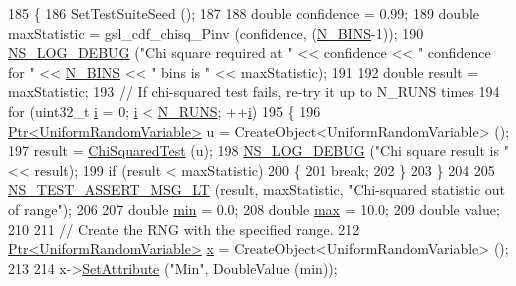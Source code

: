 \begin{DoxyCode}
185 \{
186   SetTestSuiteSeed ();
187 
188   \textcolor{keywordtype}{double} confidence = 0.99;
189   \textcolor{keywordtype}{double} maxStatistic = gsl\_cdf\_chisq\_Pinv (confidence, (\hyperlink{classRandomVariableStreamUniformTestCase_ab9bd5ab207c7358f8425b7b4ca516c42}{N\_BINS}-1));
190   \hyperlink{group__logging_ga413f1886406d49f59a6a0a89b77b4d0a}{NS\_LOG\_DEBUG} (\textcolor{stringliteral}{"Chi square required at "} << confidence << \textcolor{stringliteral}{" confidence for "} << 
      \hyperlink{classRandomVariableStreamUniformTestCase_ab9bd5ab207c7358f8425b7b4ca516c42}{N\_BINS} << \textcolor{stringliteral}{" bins is "} << maxStatistic);
191 
192   \textcolor{keywordtype}{double} result = maxStatistic;
193   \textcolor{comment}{// If chi-squared test fails, re-try it up to N\_RUNS times}
194   \textcolor{keywordflow}{for} (uint32\_t \hyperlink{bernuolliDistribution_8m_a6f6ccfcf58b31cb6412107d9d5281426}{i} = 0; \hyperlink{bernuolliDistribution_8m_a6f6ccfcf58b31cb6412107d9d5281426}{i} < \hyperlink{classRandomVariableStreamUniformTestCase_a12d6e3ab344655b6af2b31b5dcc043af}{N\_RUNS}; ++\hyperlink{bernuolliDistribution_8m_a6f6ccfcf58b31cb6412107d9d5281426}{i})
195     \{
196       \hyperlink{classns3_1_1Ptr}{Ptr<UniformRandomVariable>} u = CreateObject<UniformRandomVariable> ();
197       result = \hyperlink{classRandomVariableStreamUniformTestCase_ad54d3117255be7b5a8a79fced7d66d8a}{ChiSquaredTest} (u);
198       \hyperlink{group__logging_ga413f1886406d49f59a6a0a89b77b4d0a}{NS\_LOG\_DEBUG} (\textcolor{stringliteral}{"Chi square result is "} << result);
199       \textcolor{keywordflow}{if} (result < maxStatistic)
200         \{
201           \textcolor{keywordflow}{break};
202         \}
203     \}
204 
205   \hyperlink{group__testing_ga1d96848b91407c9a0b36583e8b0ad7ae}{NS\_TEST\_ASSERT\_MSG\_LT} (result, maxStatistic, \textcolor{stringliteral}{"Chi-squared statistic out of range"});
206 
207   \textcolor{keywordtype}{double} \hyperlink{80211b_8c_ac6afabdc09a49a433ee19d8a9486056d}{min} = 0.0;
208   \textcolor{keywordtype}{double} \hyperlink{80211b_8c_affe776513b24d84b39af8ab0930fef7f}{max} = 10.0;
209   \textcolor{keywordtype}{double} value;
210 
211   \textcolor{comment}{// Create the RNG with the specified range.}
212   \hyperlink{classns3_1_1Ptr}{Ptr<UniformRandomVariable>} \hyperlink{lte__link__budget__x2__handover__measures_8m_a9336ebf25087d91c818ee6e9ec29f8c1}{x} = CreateObject<UniformRandomVariable> ();
213 
214   x->\hyperlink{classns3_1_1ObjectBase_ac60245d3ea4123bbc9b1d391f1f6592f}{SetAttribute} (\textcolor{stringliteral}{"Min"}, DoubleValue (min));

\end{DoxyCode}
